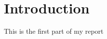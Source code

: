 \documentclass{article}
\begin{document}
\section{Introduction}
This is the first part of my report
\end{document}
